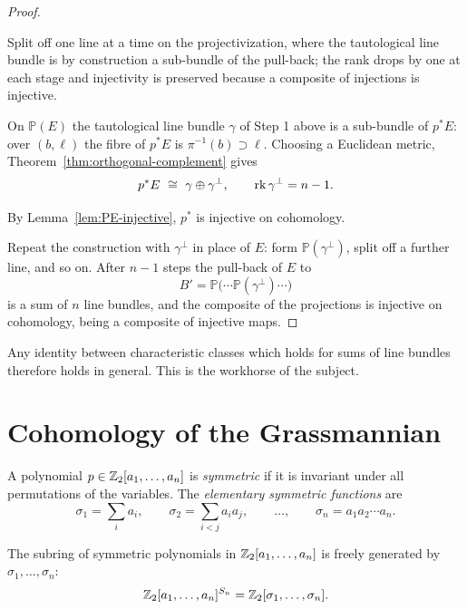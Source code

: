 \begin{proof}
\begin{strategy}
Split off one line at a time on the projectivization, where the tautological
line bundle is by construction a sub-bundle of the pull-back; the rank drops by
one at each stage and injectivity is preserved because a composite of injections
is injective.
\end{strategy}

 On $\mathbb P(E)$ the tautological line bundle $\gamma$ of Step 1 above
is a sub-bundle of $p^*E$: over $(b,\ell)$ the fibre of $p^*E$ is
$\pi^{-1}(b)\supset\ell$. Choosing a Euclidean metric,
Theorem~\ref{thm:orthogonal-complement} gives
\[
p^*E\ \iso\ \gamma\oplus\gamma^{\perp},
\qquad \rk\gamma^\perp=n-1 .
\]

 By Lemma~\ref{lem:PE-injective}, $p^*$ is injective on cohomology.

 Repeat the construction with $\gamma^{\perp}$ in place of $E$: form
$\mathbb P(\gamma^\perp)$, split off a further line, and so on. After $n-1$
steps the pull-back of $E$ to
\[
B'=\mathbb P\big(\cdots\mathbb P(\gamma^\perp)\cdots\big)
\]
is a sum of $n$ line bundles, and the composite of the projections is injective
on cohomology, being a composite of injective maps.
\end{proof}

Any identity between characteristic classes which holds for sums of line bundles
therefore holds in general. This is the workhorse of the subject.

\section{Cohomology of the Grassmannian}

\begin{definition}
A polynomial $p\in\mathbb{Z}_2[a_1,\dots,a_n]$ is \emph{symmetric} if it is invariant
under all permutations of the variables. The \emph{elementary symmetric
functions} are
\[
\sigma_1=\sum_i a_i,
\qquad
\sigma_2=\sum_{i<j}a_ia_j,
\qquad\dots,\qquad
\sigma_n=a_1a_2\cdots a_n .
\]
\end{definition}

\begin{theorem}
The subring of symmetric polynomials in $\mathbb{Z}_2[a_1,\dots,a_n]$ is freely
generated by $\sigma_1,\dots,\sigma_n$:
\[
\mathbb{Z}_2[a_1,\dots,a_n]^{S_n}=\mathbb{Z}_2[\sigma_1,\dots,\sigma_n].
\]
\end{theorem}

